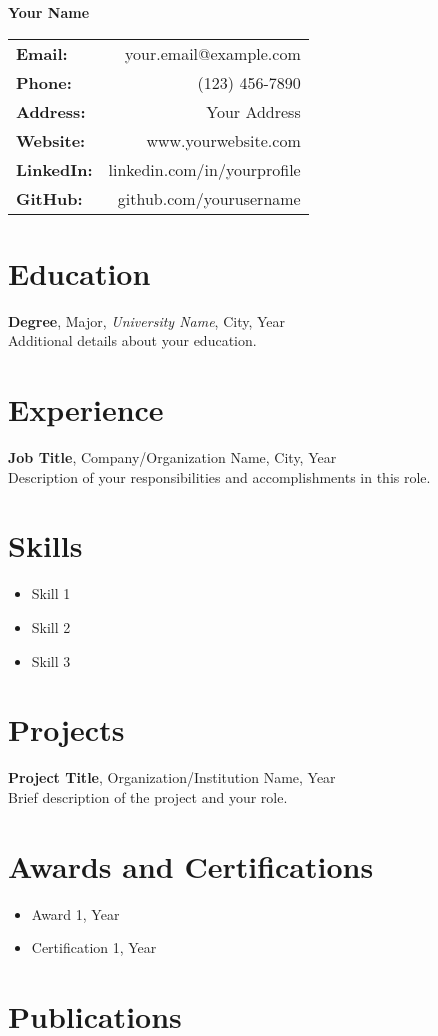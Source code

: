 \documentclass{article}
\makeatletter
\newcommand{\fullname}{Your Name}
\newcommand{\email}{your.email@example.com}
\newcommand{\phone}{(123) 456-7890}
\newcommand{\address}{Your Address}
\newcommand{\website}{www.yourwebsite.com}
\newcommand{\linkedin}{linkedin.com/in/yourprofile}
\newcommand{\github}{github.com/yourusername}
\makeatother
\begin{document}
\begin{center}
    \textbf{\Huge \fullname}
\end{center}
\begin{center}
    \begin{tabular}{l r}
        \textbf{Email:} & \email \\
        \textbf{Phone:} & \phone \\
        \textbf{Address:} & \address \\
        \textbf{Website:} & \website \\
        \textbf{LinkedIn:} & \linkedin \\
        \textbf{GitHub:} & \github \\
    \end{tabular}
\end{center}

\section*{Education}
\textbf{Degree}, Major, \textit{University Name}, City, Year \\
Additional details about your education.

\section*{Experience}
\textbf{Job Title}, Company/Organization Name, City, Year \\
Description of your responsibilities and accomplishments in this role.

\section*{Skills}
\begin{itemize}
    \item Skill 1
    \item Skill 2
    \item Skill 3
\end{itemize}

\section*{Projects}
\textbf{Project Title}, Organization/Institution Name, Year \\
Brief description of the project and your role.

\section*{Awards and Certifications}
\begin{itemize}
    \item Award 1, Year
    \item Certification 1, Year
\end{itemize}


\section*{Publications}
\nocite{*}
\printbibliography[heading=none]
\end{document}
